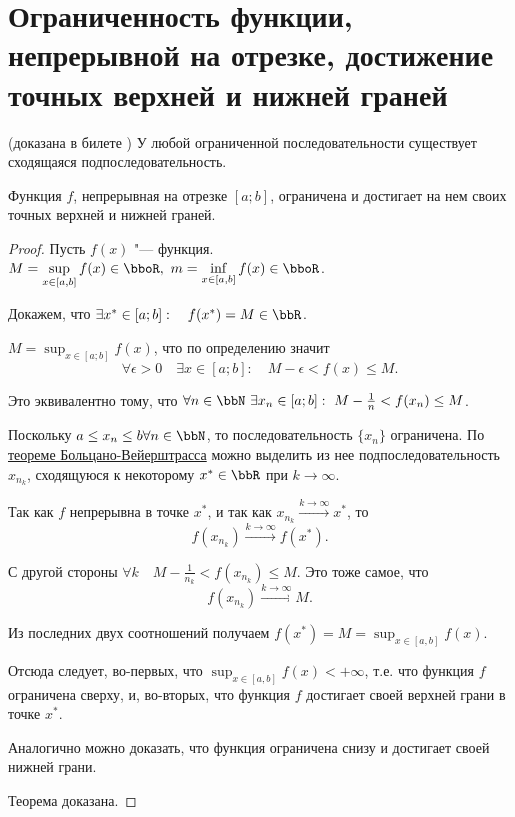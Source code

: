 \section{Ограниченность функции, непрерывной на отрезке, достижение точных верхней и нижней граней}

\begin{thm}(доказана в билете )
У любой ограниченной последовательности существует сходящаяся подпоследовательность.
\end{thm}


\begin{thm}  \label{th:ch2:Veyershtrass}
Функция $f$, непрерывная на отрезке $[a;b]$, ограничена и достигает на нем своих точных верхней и нижней граней.
\end{thm}
\begin{proof}
Пусть $f(x)$ "--- функция. $M = \sup_{x \in [a,b]}\limits f(x) \in \bboR,\  m = \inf_{x \in [a,b]}\limits f(x) \in \bboR$.

Докажем, что $\exists x^* \in [a;b]:\quad f(x^*)= M \in \bbR$.
\smallskip

$M = \sup_{x \in [a;b]}\limits f(x)$, что по определению значит 
$$
\forall\epsilon > 0\quad \exists x\in [a;b]:\quad M-\epsilon < f(x) \le M. 
$$ 

Это эквивалентно тому, что $\forall n \in \bbN\ \exists x_n \in [a;b]:\ M-\frac{1}{n} < f(x_n) \le M $.

Поскольку $ a\le x_n \le b \forall n \in \bbN$, то последовательность $\{x_n\}$ ограничена. По \hyperref[th:ch1:TBV]{теореме Больцано-Вейерштрасса} можно выделить из нее подпоследовательность ${x_{n_k}}$, сходящуюся к некоторому $x^* \in \bbR$ при $k \to \infty$.

Так как $f$ непрерывна в точке $x^*$, и так как $x_{n_k}\xrightarrow{k \to \infty} x^*$, то  
$$
f(x_{n_k}) \xrightarrow{k \to \infty} f(x^*).
$$ 

С другой стороны $\forall k \quad M-\frac{1}{n_k} < f(x_{n_k}) \le M$. Это тоже самое, что
$$
f(x_{n_k}) \xrightarrow{k \to \infty} M.
$$

Из последних двух соотношений получаем $f(x^*) = M = \sup_{x \in [a,b]}\limits f(x) $. 

Отсюда следует, во-первых, что  $\sup_{x \in [a,b]}\limits f(x)<+\infty$, т.е. что функция $f$ ограничена сверху, и, во-вторых, что функция $f$ достигает своей верхней грани в точке $x^*$.

Аналогично можно доказать, что функция ограничена снизу и достигает своей нижней грани.

Теорема доказана.   
\end{proof}